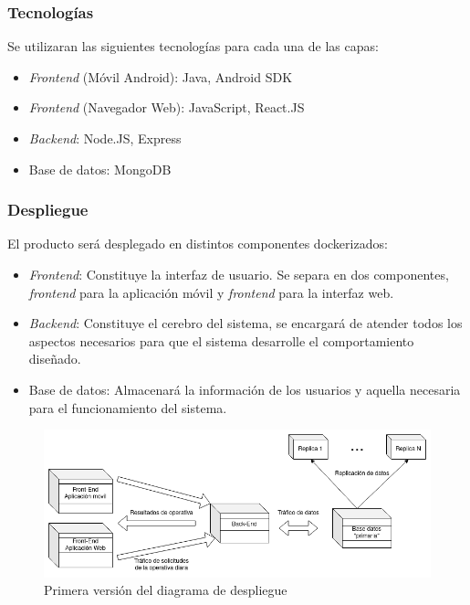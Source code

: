 \documentclass{article}
\begin{document}
\pagebreak

\subsubsection*{Tecnologías}

Se utilizaran las siguientes tecnologías para cada una de las capas:

\begin{itemize}
    \setlength\itemsep{0em}
    \item \textit{Frontend} (Móvil Android): Java, Android SDK
    \item \textit{Frontend} (Navegador Web): JavaScript, React.JS
    \item \textit{Backend}: Node.JS, Express
    \item Base de datos: MongoDB
\end{itemize}

\subsubsection*{Despliegue}

El producto será desplegado en distintos componentes dockerizados:

\begin{itemize}
    \setlength\itemsep{0em}
    \item \textit{Frontend}: Constituye la interfaz de usuario. Se separa en dos componentes, \textit{frontend} para la aplicación móvil y \textit{frontend} para la interfaz web.
    \item \textit{Backend}: Constituye el cerebro del sistema, se encargará de atender todos los aspectos necesarios para que el sistema desarrolle el comportamiento diseñado.
    \item Base de datos: Almacenará la información de los usuarios y aquella necesaria para el funcionamiento del sistema.
\end{itemize}

\begin{figure}[H]
    \centering
    \begin{adjustbox}{max size={\textwidth}{\textheight}}
        \includegraphics{../images/desplieguev1.png}
    \end{adjustbox}
    \caption{Primera versión del diagrama de despliegue}
    \label{despliegueV1}
\end{figure}
\end{document}
